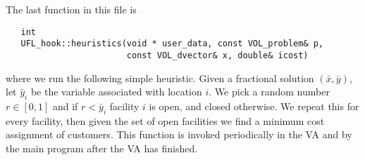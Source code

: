 \documentclass{article}
\begin{document}
The last function in this file is
\begin{verbatim}
   int 
   UFL_hook::heuristics(void * user_data, const VOL_problem& p,
                        const VOL_dvector& x, double& icost)
\end{verbatim}

\noindent where we run the following simple heuristic. 
Given a fractional solution $(\bar x, \bar y)$, let $\bar y_i$ be the variable
associated with location $i$. We pick a random number $r \in [ 0, 1 ]$ and if
$r < \bar y_i$ facility $i$ is open, and closed otherwise. We repeat this for
every facility, then given the set of open facilities we find a minimum cost
assignment of customers. This function is invoked periodically in the VA and
by the main program after the VA has finished.



\end{document}
